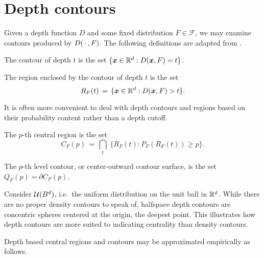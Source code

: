 \section{Depth contours}
\label{sec:multivariate_depthcontours}

Given a depth function $D$ and some fixed distribution $F \in \mathscr{F}$, we
may examine contours produced by $D(\,\cdot\,, F)$.
The following definitions are adapted from \cite{liu-parelius-singh-1999}.

\begin{definition}
    The contour of depth $t$ is the set $\{\bm{x} \in \mathbb{R}^d : D(\bm{x}, F) = t\}$.
\end{definition}

\begin{definition}
    The region enclosed by the contour of depth $t$ is the set
    \begin{equation}
        R_F(t) \,=\, \{\bm{x} \in \mathbb{R}^d : D(\bm{x}, F) > t\}.
    \end{equation}
\end{definition}

It is often more convenient to deal with depth contours and regions based on
their probability content rather than a depth cutoff.

\begin{definition}
    The $p$-th central region is the set
    \begin{equation}
        C_F(p) \,=\, \bigcap_{t}\; \{R_F(t) : P_F(R_F(t)) \geq p\}.
    \end{equation}
\end{definition}

\begin{definition}
    The $p$-th level contour, or center-outward contour surface, is the set
    $Q_F(p) = \partial C_F(p)$.
\end{definition}


\begin{example} \label{ex:uniform}
    Consider $\mathcal{U}(B^d)$, i.e.\ the uniform distribution on the unit ball in
    $\mathbb{R}^d$.
    While there are no proper density contours to speak of, halfspace depth
    contours are concentric spheres centered at the origin, the deepest point.
    This illustrates how depth contours are more suited to indicating
    centrality than density contours.
\end{example}


Depth based central regions and contours may be approximated empirically as
follows.

